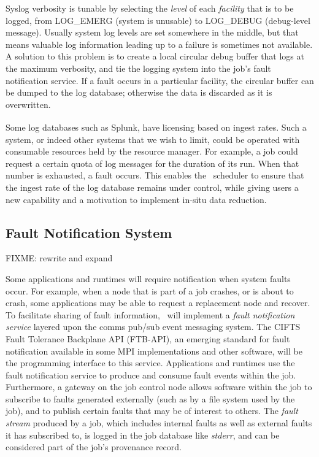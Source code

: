 Syslog verbosity is tunable by selecting the {\em level} of each
{\em facility} that is to be logged, from LOG\_EMERG (system is unusable)
to LOG\_DEBUG (debug-level message).  Usually system log levels are set
somewhere in the middle, but that means valuable log information leading
up to a failure is sometimes not available.  A solution to this problem is
to create a local circular debug buffer that logs at the maximum verbosity,
and tie the logging system into the job's fault notification service.
If a fault occurs in a particular facility, the circular buffer can be
dumped to the log database; otherwise the data is discarded as it is
overwritten.

Some log databases such as Splunk\textsuperscript{\textregistered},
have licensing based on ingest rates.  Such a system, or indeed other
systems that we wish to limit, could be operated with consumable resources
held by the resource manager.  For example, a job could request a certain
quota of log messages for the duration of its run.  When that number
is exhausted, a fault occurs.  This enables the \ngrm\ scheduler to ensure
that the ingest rate of the log database remains under control, while
giving users a new capability and a motivation to implement in-situ data
reduction.

\subsection{Fault Notification System}

FIXME: rewrite and expand

Some applications and runtimes will require notification when system faults
occur.  For example, when a node that is part of a job crashes, or is about to
crash, some applications may be able to request a replacement node and recover.
To facilitate sharing of fault information, \ngrm\ will implement a
{\em fault notification service} layered upon the comms pub/sub event
messaging system.
The CIFTS Fault Tolerance Backplane API\cite{FTBAPI} (FTB-API), an emerging
standard for fault notification available in some MPI implementations and
other software, will be the programming interface to this service.
Applications and runtimes use the fault notification service to produce
and consume fault events within the job.  Furthermore, a gateway on the
job control node allows software within the job to subscribe to faults
generated externally (such as by a file system used by the job), and to
publish certain faults that may be of interest to others.
The {\em fault stream} produced by a job, which includes internal faults
as well as external faults it has subscribed to, is logged in the job database
like {\em stderr}, and can be considered part of the job's provenance record.

